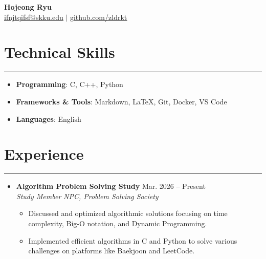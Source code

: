 \documentclass[letterpaper, 10pt]{article}
\begin{document}
\begin{center}
    \textbf{\LARGE Hojeong Ryu} \\ \vspace{2pt}
    \href{mailto:ifnjtqifsf@skku.edu}{\underline{ifnjtqifsf@skku.edu}} $|$ 
    \href{https://github.com/zldrkt}{\underline{github.com/zldrkt}}
\end{center}

\section*{Technical Skills}
\hrule
\vspace{4pt}
\begin{itemize}
    \item[] \textbf{Programming}: C, C++, Python
    \item[] \textbf{Frameworks \& Tools}: Markdown, LaTeX, Git, Docker, VS Code
    \item[] \textbf{Languages}: English
\end{itemize}

\section*{Experience}
\hrule
\vspace{4pt}
\begin{itemize}
    \item 
    \textbf{Algorithm Problem Solving Study} \hfill Mar. 2026 -- Present \\
    \textit{Study Member} \hfill \textit{NPC, Problem Solving Society}
    \begin{itemize}
        \item Discussed and optimized algorithmic solutions focusing on time complexity, Big-O notation, and Dynamic Programming.
        \item Implemented efficient algorithms in C and Python to solve various challenges on platforms like Baekjoon and LeetCode.
    \end{itemize}
\end{itemize}

\end{document}
